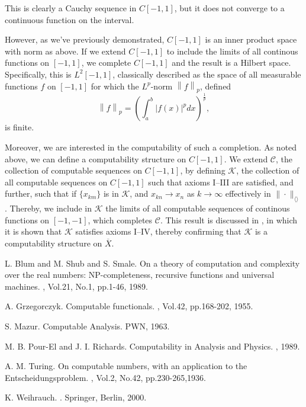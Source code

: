 \documentclass[a4paper,10pt]{article}
\begin{document}
This is clearly a Cauchy sequence in $C\left[-1, 1\right]$, but it does not converge to a continuous function on the interval.

However, as we've previously demonstrated, $C\left[-1, 1\right]$ is an inner product space with norm as above.  If we extend $C\left[-1, 1\right]$ to include the limits of all continous functions on $\left[-1, 1\right]$, we complete $C\left[-1, 1\right]$ and the result is a Hilbert space.  Specifically, this is $L^2\left[-1, 1\right]$, classically described as the space of all measurable functions $f$ on $\left[-1, 1\right]$ for which the $L^p$-norm $\left\|f\right\|_p$, defined $$\left\|f\right\|_p = \left(\int_a^b \left|f(x)\right|^p dx \right)^{\frac{1}{p}},$$ is finite.

Moreover, we are interested in the computability of such a completion.  As noted above, we can define a computability structure on $C\left[-1, 1\right]$.  We extend $\mathscr{C}$, the collection of computable sequences on $C\left[-1, 1\right]$, by defining $\mathscr{K}$, the collection of all computable sequences on $C\left[-1, 1\right]$ such that axioms I--III are satisfied, and further, such that if $\{x_{km}\}$ is in $\mathscr{K}$, and $x_{kn} \rightarrow x_{n}$ as $k \rightarrow \infty$ effectively in $\| \cdot \|_{\langle\rangle}$.  Thereby, we include in $\mathscr{K}$ the limits of all computable sequences of continous functions on $\left[-1, -1\right]$, which completes $\mathscr{C}$.  This result is discussed in \cite{PR89}, in which it is shown that $\mathscr{K}$ satisfies axioms I--IV, thereby confirming that $\mathscr{K}$ is a computability structure on $\overline{X}$.



%

\begin{thebibliography}{10}

L. Blum and M. Shub and S. Smale.
\newblock On a theory of
computation and complexity over the real numbers: {NP}-completeness, recursive functions and universal machines.
, Vol.21, No.1, pp.1-46, 1989.

A. Grzegorczyk.
\newblock Computable functionals.
, Vol.42, pp.168-202, 1955.

S. Mazur.
\newblock Computable Analysis.
\newblock PWN, 1963.

M. B. Pour-El and J. I. Richards.
\newblock Computability in Analysis and Physics.
, 1989.

A. M. Turing.
 \newblock On computable numbers, with an application to the
 {E}ntscheidungsproblem.
 , Vol.2, No.42,
 pp.230-265,1936.

K. Weihrauch.
.
\newblock Springer, Berlin, 2000.



\end{thebibliography}
\end{document}
